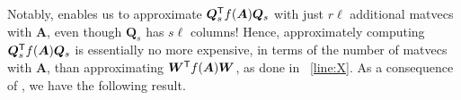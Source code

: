 Notably,  enables us to approximate $\bm{Q}_s^{\textsf{\textup{T}}} f(\bm{A})\bm{Q}_s$ with just $r\ell$  additional matvecs with $\bm{A}$, even though $\bm{Q}_s$ has $s\ell$ columns! Hence, approximately computing $\bm{Q}_s^{\textsf{\textup{T}}} f(\bm{A}) \bm{Q}_s$ is essentially no more expensive, in terms of the number of matvecs with $\bm{A}$, than approximating $\bm{W}^{\textsf{\textup{T}}} f(\bm{A}) \bm{W}$, as done in ~\cref{line:X}. As a consequence of , we have the following result. 
